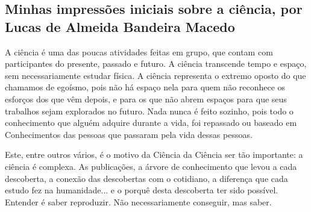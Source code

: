 \subsection{Minhas impressões iniciais sobre a ciência, por Lucas de Almeida Bandeira Macedo}

A ciência é uma das poucas atividades feitas em grupo, que contam com participantes do presente, passado e futuro. A ciência transcende tempo e espaço, sem necessariamente estudar física. A ciência representa o extremo oposto do que chamamos de egoísmo, pois não há espaço nela para quem não reconhece os esforços dos que vêm depois, e para os que não abrem espaços para que seus trabalhos sejam explorados no futuro. Nada nunca é feito sozinho, pois todo o conhecimento que alguém adquire durante a vida, foi repassado ou baseado em \gls{Conhecimento}s das pessoas que passaram pela vida dessas pessoas.

Este, entre outros vários, é o motivo da Ciência da Ciência \citep{schwartzman_ciencia_1984} ser tão importante: a ciência é complexa. As publicações, a árvore de conhecimento que levou a cada descoberta, a conexão das descobertas com o cotidiano, a diferença que cada estudo fez na humanidade... e o porquê desta descoberta ter sido possível. Entender é saber reproduzir. Não necessariamente conseguir, mas saber.